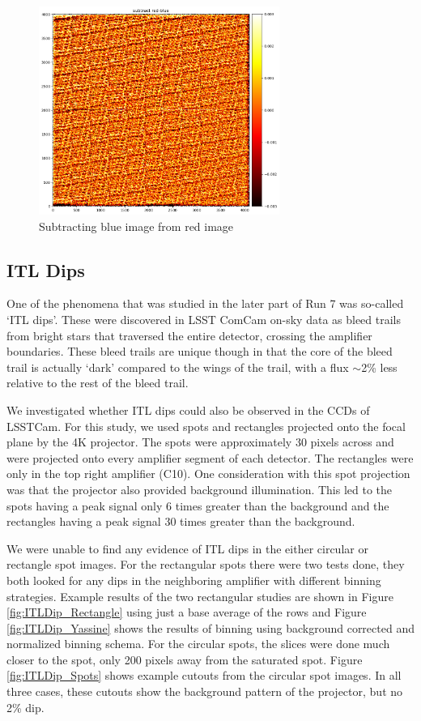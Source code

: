 \begin{figure}
\centering
\includegraphics[width=0.7\textwidth]{figures/subtract_red_blue.png}
\caption{Subtracting blue image from red image}
\label{fig:tree_ring_subtract_red_blue}
\end{figure}

\clearpage
\subsection{ITL Dips}\label{itl-dips}

One of the phenomena that was studied in the later part of Run 7 was so-called 
`ITL dips'. These were discovered in LSST ComCam on-sky data as
bleed trails from bright stars that traversed the entire detector,
crossing the amplifier boundaries. These bleed trails are unique
though in that the core of the bleed trail is actually `dark'
compared to the wings of the trail, with a flux $\sim$2\% less relative to the rest of the
bleed trail.

We investigated whether ITL dips could also be observed in the CCDs of
LSSTCam. For this study, we used spots and rectangles projected onto the focal plane by the 4K
projector. The spots were approximately 30 pixels across
and were projected onto every amplifier segment of each detector. The rectangles were only
in the top right amplifier (C10). One consideration with this spot
projection was that the projector also provided background illumination. This led to the spots having a peak signal only 6 times greater
than the background and the rectangles having a peak signal 30 times greater
than the background.

We were unable to find any evidence of ITL
dips in the either circular or rectangle spot images. For the rectangular spots there were two tests done, they both looked for any dips in the neighboring amplifier with different binning strategies. Example results of the two rectangular studies are shown in Figure \ref{fig:ITLDip_Rectangle} using just a base average of the rows and Figure \ref{fig:ITLDip_Yassine} shows the results of binning using background corrected and normalized binning schema. For the circular spots, the slices were done much closer to the spot, only 200 pixels away from the saturated spot. Figure \ref{fig:ITLDip_Spots} shows example cutouts from the circular spot images. In all three cases, these cutouts show the background
pattern of the projector, but no 2\% dip.

